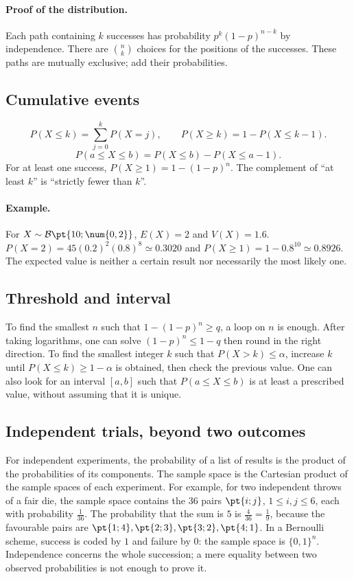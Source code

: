 \paragraph{Proof of the distribution.} Each path containing $k$ successes has probability $p^k(1-p)^{n-k}$ by independence. There are $\binom nk$ choices for the positions of the successes. These paths are mutually exclusive; add their probabilities.
\subsection{Cumulative events}
\[P(X\le k)=\sum_{j=0}^kP(X=j),\qquad P(X\ge k)=1-P(X\le k-1).\]\[P(a\le X\le b)=P(X\le b)-P(X\le a-1).\]
For at least one success, $P(X\ge1)=1-(1-p)^n$. The complement of ``at least $k$'' is ``strictly fewer than $k$''.
\paragraph{Example.} For $X\sim\mathcal B\pt{10;\num{0,2}}$, $E(X)=2$ and $V(X)=\num{1,6}$. $P(X=2)=45(\num{0,2})^2(\num{0,8})^8\simeq\num{0,3020}$ and $P(X\ge1)=1-\num{0,8}^{10}\simeq\num{0,8926}$. The expected value is neither a certain result nor necessarily the most likely one.
\subsection{Threshold and interval}
To find the smallest $n$ such that $1-(1-p)^n\ge q$, a loop on $n$ is enough. After taking logarithms, one can solve $(1-p)^n\le1-q$ then round in the right direction.
To find the smallest integer $k$ such that $P(X>k)\le\alpha$, increase $k$ until $P(X\le k)\ge1-\alpha$ is obtained, then check the previous value. One can also look for an interval $[a,b]$ such that $P(a\le X\le b)$ is at least a prescribed value, without assuming that it is unique.
\subsection{Independent trials, beyond two outcomes}
For independent experiments, the probability of a list of results is the product of the probabilities of its components. The sample space is the Cartesian product of the sample spaces of each experiment. For example, for two independent throws of a fair die, the sample space contains the $36$ pairs $\pt{i;j}$, $1\le i,j\le6$, each with probability $\frac{1}{36}$. The probability that the sum is $5$ is $\frac{4}{36}=\frac{1}{9}$, because the favourable pairs are $\pt{1;4},\pt{2;3},\pt{3;2},\pt{4;1}$.
In a Bernoulli scheme, success is coded by $1$ and failure by $0$: the sample space is $\{0,1\}^n$. Independence concerns the whole succession; a mere equality between two observed probabilities is not enough to prove it.


